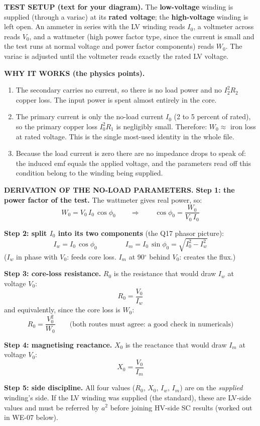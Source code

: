 \documentclass[11pt]{article}
\newcommand{\tagline}[1]{\textbf{\color{copper}#1}}
\begin{document}
\tagline{TEST SETUP (text for your diagram).} The \textbf{low-voltage} winding is supplied (through a variac) at its \textbf{rated voltage}; the \textbf{high-voltage} winding is left open. An ammeter in series with the LV winding reads $I_0$, a voltmeter across reads $V_0$, and a wattmeter (high power factor type, since the current is small and the test runs at normal voltage and power factor components) reads $W_0$. The variac is adjusted until the voltmeter reads exactly the rated LV voltage.

\tagline{WHY IT WORKS (the physics points).}
\begin{enumerate}[label=\arabic*.]
\item The secondary carries no current, so there is no load power and no $I_2^2 R_2$ copper loss. The input power is spent almost entirely in the core.
\item The primary current is only the no-load current $I_0$ (2 to 5 percent of rated), so the primary copper loss $I_0^2 R_1$ is negligibly small. Therefore: $W_0 \approx$ iron loss at rated voltage. This is the single most-used identity in the whole file.
\item Because the load current is zero there are no impedance drops to speak of: the induced emf equals the applied voltage, and the parameters read off this condition belong to the winding being supplied.
\end{enumerate}

\tagline{DERIVATION OF THE NO-LOAD PARAMETERS.}
\textbf{Step 1: the power factor of the test.} The wattmeter gives real power, so:
\[
W_0 = V_0\, I_0\, \cos\phi_0
\qquad\Longrightarrow\qquad
\cos\phi_0 = \frac{W_0}{V_0\, I_0}
\]

\textbf{Step 2: split $I_0$ into its two components} (the Q17 phasor picture):
\[
I_w = I_0\, \cos\phi_0
\qquad\qquad
I_m = I_0\, \sin\phi_0 = \sqrt{I_0^{2} - I_w^{2}}
\]
($I_w$ in phase with $V_0$: feeds core loss. $I_m$ at 90$^\circ$ behind $V_0$: creates the flux.)

\textbf{Step 3: core-loss resistance.} $R_0$ is the resistance that would draw $I_w$ at voltage $V_0$:
\[
R_0 = \frac{V_0}{I_w}
\]
and equivalently, since the core loss is $W_0$:
\[
R_0 = \frac{V_0^{2}}{W_0}
\qquad\text{(both routes must agree: a good check in numericals)}
\]

\textbf{Step 4: magnetising reactance.} $X_0$ is the reactance that would draw $I_m$ at voltage $V_0$:
\[
X_0 = \frac{V_0}{I_m}
\]

\textbf{Step 5: side discipline.} All four values ($R_0$, $X_0$, $I_w$, $I_m$) are on the \emph{supplied} winding's side. If the LV winding was supplied (the standard), these are LV-side values and must be referred by $a^{2}$ before joining HV-side SC results (worked out in WE-07 below).
\end{document}
